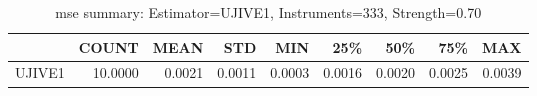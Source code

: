 \begin{table}[ht]
\centering
\caption{mse summary: Estimator=UJIVE1, Instruments=333, Strength=0.70}
\begin{tabular}{lrrrrrrrr}
\toprule
 & COUNT & MEAN & STD & MIN & 25\% & 50\% & 75\% & MAX \\
\midrule
UJIVE1 & 10.0000 & 0.0021 & 0.0011 & 0.0003 & 0.0016 & 0.0020 & 0.0025 & 0.0039 \\
\bottomrule
\end{tabular}
\end{table}
